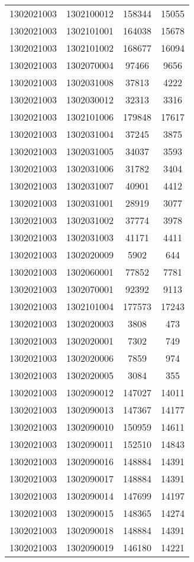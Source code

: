 \begin{longtable}[h]{llcc}
		1302021003 & 1302100012 & 158344 & 15055\\
		1302021003 & 1302101001 & 164038 & 15678\\
		1302021003 & 1302101002 & 168677 & 16094\\
		1302021003 & 1302070004 & 97466 & 9656\\
		1302021003 & 1302031008 & 37813 & 4222\\
		1302021003 & 1302030012 & 32313 & 3316\\
		1302021003 & 1302101006 & 179848 & 17617\\
		1302021003 & 1302031004 & 37245 & 3875\\
		1302021003 & 1302031005 & 34037 & 3593\\
		1302021003 & 1302031006 & 31782 & 3404\\
		1302021003 & 1302031007 & 40901 & 4412\\
		1302021003 & 1302031001 & 28919 & 3077\\
		1302021003 & 1302031002 & 37774 & 3978\\
		1302021003 & 1302031003 & 41171 & 4411\\
		1302021003 & 1302020009 & 5902 & 644\\
		1302021003 & 1302060001 & 77852 & 7781\\
		1302021003 & 1302070001 & 92392 & 9113\\
		1302021003 & 1302101004 & 177573 & 17243\\
		1302021003 & 1302020003 & 3808 & 473\\
		1302021003 & 1302020001 & 7302 & 749\\
		1302021003 & 1302020006 & 7859 & 974\\
		1302021003 & 1302020005 & 3084 & 355\\
		1302021003 & 1302090012 & 147027 & 14011\\
		1302021003 & 1302090013 & 147367 & 14177\\
		1302021003 & 1302090010 & 150959 & 14611\\
		1302021003 & 1302090011 & 152510 & 14843\\
		1302021003 & 1302090016 & 148884 & 14391\\
		1302021003 & 1302090017 & 148884 & 14391\\
		1302021003 & 1302090014 & 147699 & 14197\\
		1302021003 & 1302090015 & 148365 & 14274\\
		1302021003 & 1302090018 & 148884 & 14391\\
		1302021003 & 1302090019 & 146180 & 14221\\

\end{longtable}

